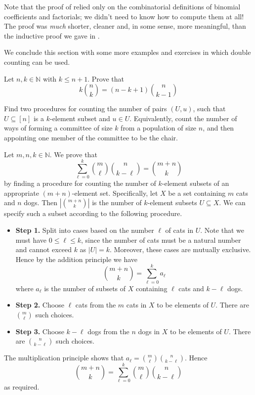 Note that the proof of  relied only on the combinatorial definitions of binomial coefficients and factorials; we didn't need to know how to compute them at all! The proof was \textit{much} shorter, cleaner and, in some sense, more meaningful, than the inductive proof we gave in .

We conclude this section with some more examples and exercises in which
double counting
can be used.

\begin{exercise}
\label{exCountingKTimesNChooseK}
Let $n,k \in \mathbb{N}$ with $k \le n+1$. Prove that
\[ k \binom{n}{k} = (n-k+1) \binom{n}{k-1} \]
\begin{backhint}
Find two procedures for counting the number of pairs $(U, u)$, such that $U \subseteq [n]$ is a $k$-element subset and $u \in U$. Equivalently, count the number of ways of forming a committee of size $k$ from a population of size $n$, and then appointing one member of the committee to be the chair.
\end{backhint}
\end{exercise}

\begin{example}
\label{exCombinatorialIdentityCatsAndDogs}
Let $m,n,k \in \mathbb{N}$. We prove that
\[ \sum_{\ell=0}^k \binom{m}{\ell} \binom{n}{k-\ell} = \binom{m+n}{k} \]
by finding a procedure for counting the number of $k$-element subsets of an appropriate $(m+n)$-element set. Specifically, let $X$ be a set containing $m$ cats and $n$ dogs. Then $\left| \binom{m+n}{k} \right|$ is the number of $k$-element subsets $U \subseteq X$. We can specify such a subset according to the following procedure.
\begin{itemize}
\item \textbf{Step 1.} Split into cases based on the number $\ell$ of cats in $U$. Note that we must have $0 \le \ell \le k$, since the number of cats must be a natural number and cannot exceed $k$ as $|U|=k$. Moreover, these cases are mutually exclusive. Hence by the addition principle we have
\[ \binom{m+n}{k} = \sum_{\ell=0}^k a_{\ell} \]
where $a_{\ell}$ is the number of subsets of $X$ containing $\ell$ cats and $k-\ell$ dogs.
\item \textbf{Step 2.} Choose $\ell$ cats from the $m$ cats in $X$ to be elements of $U$. There are $\binom{m}{\ell}$ such choices.
\item \textbf{Step 3.} Choose $k-\ell$ dogs from the $n$ dogs in $X$ to be elements of $U$. There are $\binom{n}{k-\ell}$ such choices.
\end{itemize}
The multiplication principle shows that $a_{\ell} = \binom{m}{\ell} \binom{n}{k-\ell}$. Hence
\[ \binom{m+n}{k} = \sum_{\ell=0}^k \binom{m}{\ell} \binom{n}{k-\ell} \]
as required.
\end{example}


